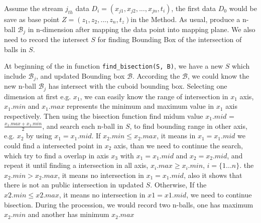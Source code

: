 \documentclass{report}
\begin{document}
Assume the stream $j_{th}$ data	
$D_i = (x_{j1}, x_{j2}, ..., x_{jn},t_i)$, the first data $D_0$ would	
be save as base point $Z=(z_{1}, z_{2}, ..., z_{n},t_z)$in the Method.	
As usual, produce a n-ball ${\mathcal{B}_j}$ in n-dimension after mapping the data point into mapping plane.
We also need to record the intersect $S$ for finding Bounding Box of the intersection of balls in $S$.

At beginning of the in function \texttt{find\_bisection(S, B)}, we have a new $S$ which include $\mathcal{B}_j$, and updated Bounding box $\mathcal{B}$. According the $\mathcal{B}$, we could know the new n-ball $\mathcal{B}_j$ has intersect with the cuboid bounding box. Selecting one dimension at first e.g. $x_1$, we can easily know the range of intersection in $x_1$ axis, $x_1.min$ and $x_1.max$ represents the minimum and maximum value in $x_1$ axis respectively. Then using the bisection function find midum value $x_1.mid$ = $\frac{x_1.max + x_1.min}{2}$, and search each n-ball in $S$, to find bounding range in other axis, e.g. $x_2$ by using $x_1 = x_1.mid$. If $x_2.min \leqslant x_2.max$, it means in $x_1 = x_1.mid$ we could find a intersected point in $x_2$ axis, than we need to continue the search, which try to find a overlap in axis $x_3$ with $x_1 = x_1.mid$ and $x_2 = x_2.mid$, and repeat it until finding a intersection in all axis, $x_i.max \geqslant x_i.min$, $i = \{1...n \}$. the $x_2.min > x_2.max$, it means no intersection in $x_1 = x_1.mid$, also it shows that there is not an public intersection in updated $S$. Otherwise,  If the $x2.min \leqslant x2.max$,  it means no intersection in $x1=x1.mid$, we need to continue bisection. During the procession, we would record two n-balls, one has maximum $x_2.min$ and another has minimum $x_2.max$
\end{document}
